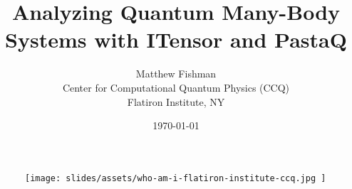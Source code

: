 \documentclass{beamer}
\title{
  \centering
  Analyzing Quantum Many-Body Systems with ITensor and PastaQ
}
\author{
  \centering
  Matthew Fishman \\
  Center for Computational Quantum Physics (CCQ) \\
  Flatiron Institute, NY \\
  \myhref{mtfishman.github.io}{https://mtfishman.github.io/}
}
\date{\today}
\begin{document}
\begin{frame}

  \begin{center}

    \maketitle

  \end{center}

  \begin{figure}[T]

      \centering
      \texttt{[image: 
        slides/assets/who-am-i-flatiron-institute-ccq.jpg
      ]}

  \end{figure}

\end{frame}










































\end{document}
